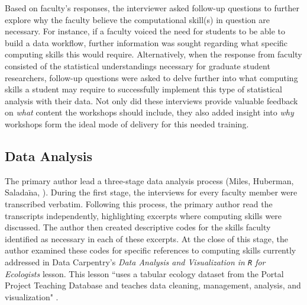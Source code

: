 \documentclass[12pt]{article}
\begin{document}
\quad Based on faculty's responses, the interviewer asked follow-up questions to
further explore why the faculty believe the computational skill(s) in question 
are necessary. For instance, if a faculty voiced the need for students to be 
able to build a data workflow, further information was sought regarding what 
specific computing skills this would require. Alternatively, when the response 
from faculty consisted of the statistical understandings necessary for graduate
student researchers, follow-up questions were asked to delve further into what
computing skills a student may require to successfully implement this type of
statistical analysis with their data. Not only did these interviews provide
valuable feedback on \emph{what} content the workshops should include, they also
added insight into \emph{why} workshops form the ideal mode of delivery for this
needed training.  

\subsection{Data Analysis} 

\quad The primary author lead a three-stage data analysis process (Miles, 
Huberman, Salada$\tilde{\text{n}}$a, \citeyear{miles}). During the first stage,
the interviews for every faculty member were transcribed verbatim. Following 
this process, the primary author read the transcripts independently, 
highlighting excerpts where computing skills were discussed. The author then 
created descriptive codes for the skills faculty identified as necessary in each
of these excerpts. At the close of this stage, the author examined these codes 
for specific references to computing skills currently addressed in Data 
Carpentry's \emph{Data Analysis and Visualization in \texttt{R} for Ecologists} 
lesson. This lesson ``uses a tabular ecology dataset from the Portal Project 
Teaching Database and teaches data cleaning, management, analysis, and 
visualization" \citep{ecology_curriculum}. 
\end{document}

